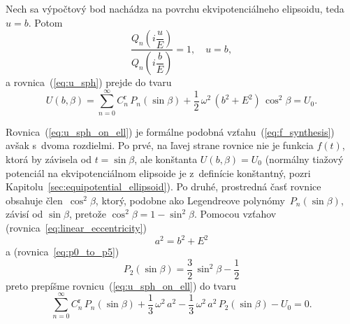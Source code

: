 \documentclass[a4paper, 12pt]{book}
\begin{document}
Nech sa výpočtový bod nachádza na povrchu ekvipotenciálneho elipsoidu, teda $u 
= b$.  Potom
%
\begin{equation}
\frac{Q_n\left( i \dfrac{u}{E} \right)}{Q_n\left( i \dfrac{b}{E} \right)} 
= 1{,} \quad u = b{,}
\end{equation}
%
a rovnica~(\ref{eq:u_sph}) prejde do tvaru
%
\begin{equation}
\label{eq:u_sph_on_ell}
U(b, \beta) = \sum_{n = 0}^\infty C^{\mathrm{r}}_n \, P_n(\sin\beta) 
+ \frac{1}{2} \, \omega^2 \, (b^2 + E^2) \, \cos^2\beta = U_0{.}
\end{equation}

Rovnica~(\ref{eq:u_sph_on_ell}) je formálne podobná 
vzťahu~(\ref{eq:f_synthesis}) avšak s~dvoma rozdielmi.  Po prvé, na ľavej 
strane rovnice nie je funkcia $f(t)$, ktorá by závisela od $t = \sin\beta$, ale 
konštanta $U(b, \beta) = U_0$ (normálny tiažový potenciál na ekvipotenciálnom 
elipsoide je z~definície konštantný, pozri 
Kapitolu~\ref{sec:equipotential_ellipsoid}).  Po druhé, prostredná časť rovnice 
obsahuje člen~$\cos^2\beta$, ktorý, podobne ako Legendreove 
polynómy~$P_n(\sin\beta)$, závisí od $\sin\beta$, pretože $\cos^2\beta 
= 1 - \sin^2\beta$.  Pomocou vzťahov (rovnica~\ref{eq:linear_eccentricity})
%
\begin{equation}
a^2 = b^2 + E^2
\end{equation}
%
a (rovnica~\ref{eq:p0_to_p5})
%
\begin{equation}
P_2(\sin\beta) = \frac{3}{2} \, \sin^2\beta - \frac{1}{2}
\end{equation}
%
preto prepíšme rovnicu~(\ref{eq:u_sph_on_ell}) do tvaru
%
\begin{equation}
\label{eq:cnr}
\sum_{n = 0}^\infty C^{\mathrm{r}}_n \, P_n(\sin\beta) + \frac{1}{3} \, 
\omega^2 \, a^2  - \frac{1}{3} \, \omega^2 \, a^2 \, P_2(\sin\beta) - U_0 
= 0{.}
\end{equation}
\end{document}

